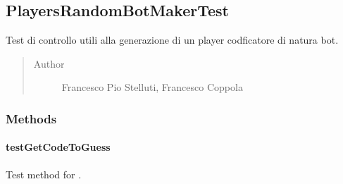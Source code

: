 \documentclass[letterpaper,10pt,italian]{sphinxmanual}
\begin{document}
\subsection{PlayersRandomBotMakerTest}
\label{\detokenize{test/it/unicam/cs/pa/mastermind/test/PlayersRandomBotMakerTest:playersrandombotmakertest}}\label{\detokenize{test/it/unicam/cs/pa/mastermind/test/PlayersRandomBotMakerTest::doc}}

\begin{fulllineitems}
\label{\detokenize{test/it/unicam/cs/pa/mastermind/test/PlayersRandomBotMakerTest:it.unicam.cs.pa.mastermind.test.PlayersRandomBotMakerTest}}
Test di controllo utili alla generazione di un player codficatore di natura bot.
\begin{quote}\begin{description}
\item[{Author}] \leavevmode
Francesco Pio Stelluti, Francesco Coppola

\end{description}\end{quote}

\end{fulllineitems}



\subsubsection{Methods}
\label{\detokenize{test/it/unicam/cs/pa/mastermind/test/PlayersRandomBotMakerTest:methods}}

\paragraph{testGetCodeToGuess}
\label{\detokenize{test/it/unicam/cs/pa/mastermind/test/PlayersRandomBotMakerTest:testgetcodetoguess}}

\begin{fulllineitems}
\label{\detokenize{test/it/unicam/cs/pa/mastermind/test/PlayersRandomBotMakerTest:it.unicam.cs.pa.mastermind.test.PlayersRandomBotMakerTest.testGetCodeToGuess()}}
Test method for .

\end{fulllineitems}
\end{document}
